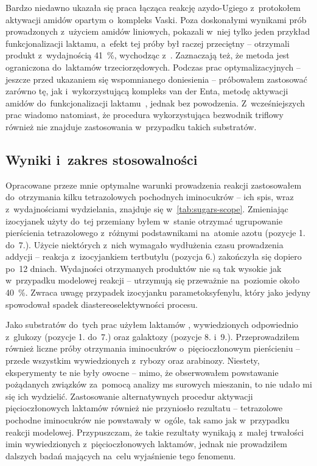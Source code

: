 Bardzo niedawno ukazała się praca łącząca reakcję azydo-Ugiego z~protokołem aktywacji amidów
  opartym o~kompleks Vaski.
Poza doskonałymi wynikami prób prowadzonych z~użyciem amidów liniowych,
  \citeauthor{dixon18} pokazali w~niej tylko jeden przykład funkcjonalizacji laktamu,
  a~efekt tej próby był raczej przeciętny \--- otrzymali produkt z~wydajnością \SI{41}{\percent},
  wychodząc z~.
Zaznaczają też, że metoda jest ograniczona do~laktamów trzeciorzędowych.
Podczas prac optymalizacyjnych \--- jeszcze przed ukazaniem się wspomnianego doniesienia \---
  próbowałem zastosować zarówno tę, jak i~wykorzystującą kompleks van der Enta, metodę aktywacji
  amidów do~funkcjonalizacji laktamu~, jednak bez powodzenia.
Z~wcześniejszych prac wiadomo natomiast, że procedura wykorzystująca
  bezwodnik triflowy również nie znajduje zastosowania w~przypadku takich substratów.

\subsection{Wyniki i~zakres stosowalności}
Opracowane przeze mnie optymalne warunki prowadzenia reakcji zastosowałem do~otrzymania kilku
  tetrazolowych pochodnych iminocukrów \--- ich spis, wraz z~wydajnościami wydzielania,
  znajduje się w~\cref{tab:sugars-scope}.
Zmieniając izocyjanek użyty do~tej przemiany byłem w~stanie otrzymać ugrupowanie pierścienia
  tetrazolowego z~różnymi podstawnikami na~atomie azotu (pozycje 1. do~7.).
Użycie niektórych z~nich wymagało wydłużenia czasu prowadzenia addycji \--- reakcja z~izocyjankiem
  tertbutylu (pozycja 6.) zakończyła się dopiero po~12 dniach.
Wydajności otrzymanych produktów nie są tak wysokie jak w~przypadku modelowej reakcji \---
  utrzymują się przeważnie na~poziomie około \SI{40}{\percent}.
Zwraca uwagę przypadek izocyjanku parametoksyfenylu, który jako jedyny spowodował spadek
  diastereoselektywności procesu.

Jako substratów do~tych prac użyłem laktamów , wywiedzionych
  odpowiednio z~glukozy (pozycje 1. do~7.) oraz galaktozy (pozycje 8. i~9.).
Przeprowadziłem również liczne próby otrzymania iminocukrów o~pięcioczłonowym pierścieniu \---
  przede wszystkim wywiedzionych z~rybozy oraz arabinozy.
Niestety, eksperymenty te nie były owocne \--- mimo, że obserwowałem powstawanie pożądanych
  związków za~pomocą analizy \gls{ms} surowych mieszanin, to nie udało mi się ich wydzielić.
Zastosowanie alternatywnych procedur aktywacji pięcioczłonowych laktamów również nie przyniosło
  rezultatu \--- tetrazolowe pochodne iminocukrów nie powstawały w~ogóle,
  tak samo jak w~przypadku reakcji modelowej.
Przypuszczam, że takie rezultaty wynikają z~małej trwałości imin wywiedzionych z~pięcioczłonowych
  laktamów, jednak nie prowadziłem dalszych badań mających na~celu wyjaśnienie tego fenomenu.

